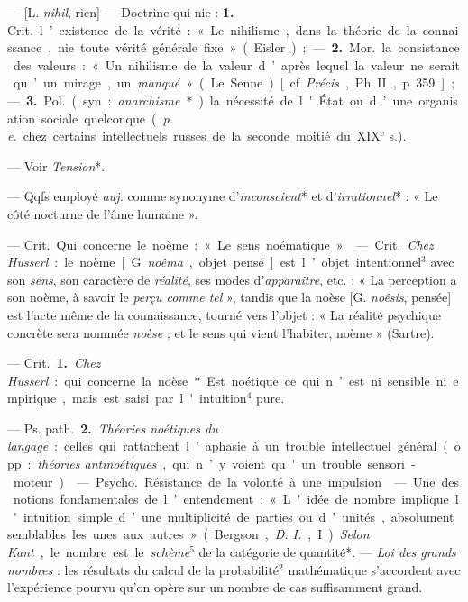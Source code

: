 \begin{itemize}[leftmargin=1cm, label=, itemsep=1pt]
 — [L. {\it nihil}, rien] —  Doctrine qui nie :
{\bf 1.} \si{Crit.} l’existence de la vérité : « Le nihilisme, dans la
théorie de la connaissance, nie toute vérité générale fixe » (Eisler) ; — 
{\bf 2.} \si{Mor.} la consistance des valeurs : « ... Un nihilisme de la
valeur d’après lequel la valeur ne serait qu’un mirage, un {\it manqué} » (Le
Senne) [cf. {\it Précis}, Ph. II, p. 359] ; — {\bf 3.} \si{Pol.} (syn. :
{\it anarchisme}*) la nécessité de l'État ou d’une organisation sociale
quelconque ({\it p. e.} chez certains intellectuels russes de la seconde
moitié du {\footnotesize XIX}$^\text{e}$ s.).

 — Voir {\it Tension}*.

 — Qqfs employé {\it auj.} comme synonyme d’{\it inconscient}*
et d’{\it irra\-tionnel}* : « Le côté nocturne de l’âme humaine ».

 — \si{Crit.} Qui concerne le noème : « Le sens noématique. »

 — \si{Crit.} {\it Chez Husserl} : le noème [G. {\it noêma},
objet pensé] est l’objet intentionnel$^3$ avec son {\it sens}, son caractère
de {\it réalité}, ses modes d’{\it apparaître}, etc. : « La perception a son
noème, à savoir le {\it perçu comme tel} », tandis que la noèse [G.
{\it noêsis}, pensée] est l’acte même de la connaissance, tourné vers
l'objet : « La réalité psychique concrète sera nommée {\it noèse} ; et le
sens qui vient l'habiter, noème » (Sartre).

 — \si{Crit.} {\bf 1.} {\it Chez Husserl} : qui concerne la
noèse*. Est noétique ce qui n’est ni sensible ni empirique, mais est saisi
par l'intuition$^4$ pure.

— \si{Ps. path.} {\bf 2.} {\it Théories noétiques du langage} : celles qui
rattachent l’aphasie à un trouble intellectuel général (opp. : {\it théories
antinoétiques}, qui n’y voient qu'un trouble sensori-moteur).

 — \si{Psycho.} Résistance de la volonté à une impulsion.

 — Une des notions fondamentales de l’entendement : « L'idée de
nombre implique l'intuition simple d’une multiplicité de parties ou d’unités,
absolument semblables les unes aux autres » (Bergson, {\it D. I.}, I).
{\it Selon Kant}, le nombre est le {\it schème}$^5$ de la catégorie de
quantité*. — {\it Loi des grands nombres} : les résultats du calcul de la
probabilité$^2$ mathématique s'accordent avec l'expérience pourvu qu'on opère
sur un nombre de cas suffisamment grand.


\end{itemize}
